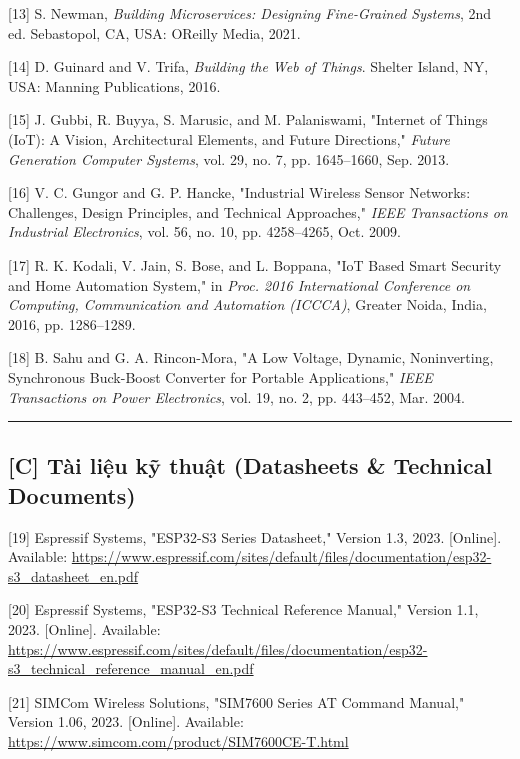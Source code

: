 \documentclass[a4paper]{extarticle}
\begin{document}
{[}13{]} S. Newman, \emph{Building Microservices: Designing Fine-Grained
Systems}, 2nd ed. Sebastopol, CA, USA: O\textquotesingle Reilly Media,
2021.

{[}14{]} D. Guinard and V. Trifa, \emph{Building the Web of Things}.
Shelter Island, NY, USA: Manning Publications, 2016.

{[}15{]} J. Gubbi, R. Buyya, S. Marusic, and M. Palaniswami, "Internet
of Things (IoT): A Vision, Architectural Elements, and Future
Directions," \emph{Future Generation Computer Systems}, vol. 29, no. 7,
pp. 1645--1660, Sep. 2013.

{[}16{]} V. C. Gungor and G. P. Hancke, "Industrial Wireless Sensor
Networks: Challenges, Design Principles, and Technical Approaches,"
\emph{IEEE Transactions on Industrial Electronics}, vol. 56, no. 10, pp.
4258--4265, Oct. 2009.

{[}17{]} R. K. Kodali, V. Jain, S. Bose, and L. Boppana, "IoT Based
Smart Security and Home Automation System," in \emph{Proc. 2016
International Conference on Computing, Communication and Automation
(ICCCA)}, Greater Noida, India, 2016, pp. 1286--1289.

{[}18{]} B. Sahu and G. A. Rincon-Mora, "A Low Voltage, Dynamic,
Noninverting, Synchronous Buck-Boost Converter for Portable
Applications," \emph{IEEE Transactions on Power Electronics}, vol. 19,
no. 2, pp. 443--452, Mar. 2004.

\begin{center}\rule{0.5\linewidth}{0.5pt}\end{center}

\subsection{{[}C{]} Tài liệu kỹ thuật (Datasheets \& Technical
Documents)}\label{c-tuxe0i-liux1ec7u-kux1ef9-thuux1eadt-datasheets--technical-documents}

{[}19{]} Espressif Systems, "ESP32-S3 Series Datasheet," Version 1.3,
2023. {[}Online{]}. Available:
\url{https://www.espressif.com/sites/default/files/documentation/esp32-s3_datasheet_en.pdf}

{[}20{]} Espressif Systems, "ESP32-S3 Technical Reference Manual,"
Version 1.1, 2023. {[}Online{]}. Available:
\url{https://www.espressif.com/sites/default/files/documentation/esp32-s3_technical_reference_manual_en.pdf}

{[}21{]} SIMCom Wireless Solutions, "SIM7600 Series AT Command Manual,"
Version 1.06, 2023. {[}Online{]}. Available:
\url{https://www.simcom.com/product/SIM7600CE-T.html}
\end{document}
